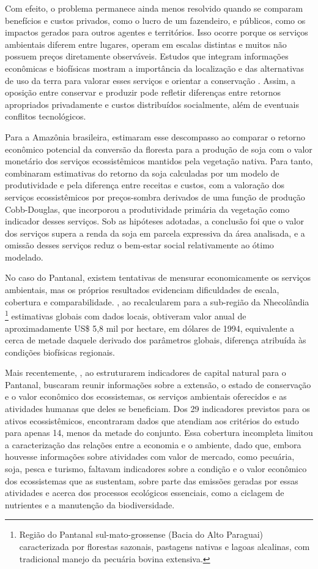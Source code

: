 Com efeito, o problema permanece ainda menos resolvido quando se comparam benefícios e custos privados, como o lucro de um fazendeiro, e públicos, como os impactos gerados para outros agentes e territórios. Isso ocorre porque os serviços ambientais diferem entre lugares, operam em escalas distintas e muitos não possuem preços diretamente observáveis. Estudos que integram informações econômicas e biofísicas mostram a importância da localização e das alternativas de uso da terra para valorar esses serviços e orientar a conservação \cite{Crossman2009,Gascoigne2011}. Assim, a oposição entre conservar e produzir pode refletir diferenças entre retornos apropriados privadamente e custos distribuídos socialmente, além de eventuais conflitos tecnológicos.

Para a Amazônia brasileira,  estimaram esse descompasso ao comparar o retorno econômico potencial da conversão da floresta para a produção de soja com o valor monetário dos serviços ecossistêmicos mantidos pela vegetação nativa. Para tanto, combinaram estimativas do retorno da soja calculadas por um modelo de produtividade e pela diferença entre receitas e custos, com a valoração dos serviços ecossistêmicos por preços-sombra derivados de uma função de produção Cobb-Douglas, que incorporou a produtividade primária da vegetação como indicador desses serviços. Sob as hipóteses adotadas, a conclusão foi que o valor dos serviços supera a renda da soja em parcela expressiva da área analisada, e a omissão desses serviços reduz o bem-estar social relativamente ao ótimo modelado.

No caso do Pantanal, existem tentativas de mensurar economicamente os serviços ambientais, mas os próprios resultados evidenciam dificuldades de escala, cobertura e comparabilidade. , ao recalcularem para a sub-região da Nhecolândia \footnote{Região do Pantanal sul-mato-grossense (Bacia do Alto Paraguai) caracterizada por florestas sazonais, pastagens nativas e lagoas alcalinas, com tradicional manejo da pecuária bovina extensiva.} estimativas globais com dados locais, obtiveram valor anual de aproximadamente US\$ 5,8 mil por hectare, em dólares de 1994, equivalente a cerca de metade daquele derivado dos parâmetros globais, diferença atribuída às condições biofísicas regionais. 

Mais recentemente, , ao estruturarem indicadores de capital natural para o Pantanal, buscaram reunir informações sobre a extensão, o estado de conservação e o valor econômico dos ecossistemas, os serviços ambientais oferecidos e as atividades humanas que deles se beneficiam. Dos 29 indicadores previstos para os ativos ecossistêmicos, encontraram dados que atendiam aos critérios do estudo para apenas 14, menos da metade do conjunto. Essa cobertura incompleta limitou a caracterização das relações entre a economia e o ambiente, dado que, embora houvesse informações sobre atividades com valor de mercado, como pecuária, soja, pesca e turismo, faltavam indicadores sobre a condição e o valor econômico dos ecossistemas que as sustentam, sobre parte das emissões geradas por essas atividades e acerca dos processos ecológicos essenciais, como a ciclagem de nutrientes e a manutenção da biodiversidade.

